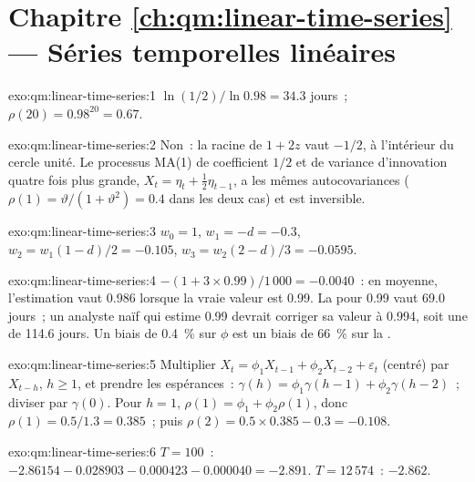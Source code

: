 \section*{Chapitre \ref{ch:qm:linear-time-series} --- Séries temporelles linéaires}

\begin{solution}{exo:qm:linear-time-series:1}
 $\ln(1/2)/\ln0.98 = 34.3$ jours~; $\rho(20) = 0.98^{20} = 0.67$.
\end{solution}

\begin{solution}{exo:qm:linear-time-series:2}
Non~: la racine de $1 + 2z$ vaut $-1/2$, à l'intérieur du cercle unité. Le processus MA(1) de coefficient $1/2$ et de variance d'innovation quatre fois plus grande, $X_t = \eta_t +
\frac12\eta_{t-1}$, a les mêmes autocovariances ($\rho(1) = \vartheta/(1 + \vartheta^2) = 0.4$ dans les deux cas) et est inversible.
\end{solution}

\begin{solution}{exo:qm:linear-time-series:3}
$w_0 = 1$, $w_1 = -d = -0.3$, $w_2 = w_1(1 - d)/2 = -0.105$, $w_3 = w_2(2 - d)/3 = -0.0595$.
\end{solution}

\begin{solution}{exo:qm:linear-time-series:4}
$-(1 + 3 \times 0.99)/1\,000 = -0.0040$~: en moyenne, l'estimation vaut 0.986 lorsque la vraie valeur est 0.99. La  pour 0.99 vaut 69.0 jours~; un analyste naïf qui
estime 0.99 devrait corriger sa valeur à 0.994, soit une  de 114.6 jours. Un biais de 0.4~\% sur $\phi$ est un biais de 66~\% sur la .
\end{solution}

\begin{solution}{exo:qm:linear-time-series:5}
Multiplier $X_t = \phi_1X_{t-1} + \phi_2X_{t-2} + \varepsilon_t$ (centré) par $X_{t-h}$, $h \ge 1$, et prendre les espérances~: $\gamma(h) = \phi_1\gamma(h - 1) + \phi_2\gamma(h - 2)$~;
diviser par $\gamma(0)$. Pour $h = 1$, $\rho(1) = \phi_1 + \phi_2\rho(1)$, donc $\rho(1) = 0.5/1.3 = 0.385$~; puis $\rho(2) = 0.5 \times 0.385 - 0.3 = -0.108$.
\end{solution}

\begin{solution}{exo:qm:linear-time-series:6}
$T = 100$~: $-2.86154 - 0.028903 - 0.000423 - 0.000040 = -2.891$. $T = 12\,574$~: $-2.862$.
\end{solution}

